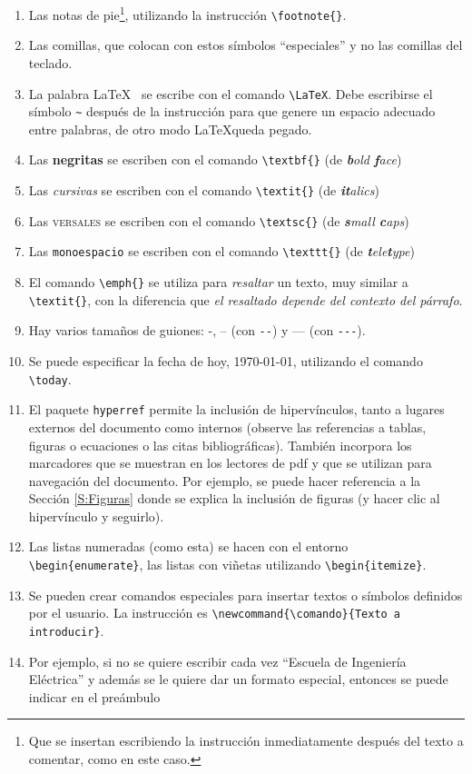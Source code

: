 \documentclass[12pt,letterpaper]{article}
\begin{document}
\begin{enumerate}
\item Las notas de pie\footnote{Que se insertan escribiendo la instrucción inmediatamente después del texto a comentar, como en este caso.}, utilizando la instrucción \verb+\footnote{}+.
\item Las comillas, que colocan con estos símbolos ``especiales'' y no las comillas del teclado. 
\item La palabra \LaTeX~ se escribe con el comando \verb+\LaTeX+. Debe escribirse el símbolo \verb+~+ después de la instrucción para que genere un espacio adecuado entre palabras, de otro modo \LaTeX queda pegado.
\item Las \textbf{negritas} se escriben con el comando \verb+\textbf{}+ (de \textit{\textbf{b}old \textbf{f}ace})
\item Las \textit{cursivas} se escriben con el comando \verb+\textit{}+ (de \textit{\textbf{it}alics})
\item Las \textsc{versales} se escriben con el comando \verb+\textsc{}+ (de \textit{\textbf{s}mall \textbf{c}aps})
\item Las \texttt{monoespacio} se escriben con el comando \verb+\texttt{}+ (de \textit{\textbf{t}ele\textbf{t}ype})
\item El comando \verb+\emph{}+ se utiliza para \emph{resaltar} un texto, muy similar a \verb+\textit{}+, con la diferencia que \textit{el resaltado depende del \emph{contexto} del párrafo}.
\item Hay varios tamaños de guiones: -, -- (con \verb+--+) y --- (con \verb+---+).
\item Se puede especificar la fecha de hoy, \today, utilizando el comando \verb+\today+.
\item El paquete \verb+hyperref+ permite la inclusión de hipervínculos, tanto a lugares externos del documento como internos (observe las referencias a tablas, figuras o ecuaciones o las citas bibliográficas). También incorpora los   marcadores que se muestran en los lectores de pdf y que se utilizan para navegación del documento. Por ejemplo, se puede hacer referencia a la Sección \ref{S:Figuras} donde se explica la inclusión de figuras (y hacer clic al hipervínculo y seguirlo).
\item Las listas numeradas (como esta) se hacen con el entorno \verb+\begin{enumerate}+, las listas con viñetas utilizando \verb+\begin{itemize}+.
\item Se pueden crear comandos especiales para insertar textos o símbolos definidos por el usuario. La instrucción es \verb+\newcommand{\comando}{Texto a introducir}+.
\item Por ejemplo, si no se quiere escribir cada vez ``Escuela de Ingeniería Eléctrica'' y además se le quiere dar un formato especial, entonces se puede indicar en el preámbulo 


\end{enumerate}
\end{document}
